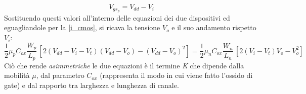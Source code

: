 \documentclass[12pt, a4paper]{report}
\begin{document}
\begin{equation}
    V_{gs_{p}} = V_{dd} - V_{i}
\end{equation}
Sostituendo questi valori all'interno delle equazioni dei due dispositivi ed eguagliandole per la \eqref{i_cmos}, si ricava la tensione $V_{o}$ e il suo andamento rispetto $V_i$:
\begin{equation*}
    \frac{1}{2}\mu_{p} C_{ox}\frac{W_p}{L_p}\,[2(V_{dd} - V_{i} - V_{t})(V_{dd} - V_{o}) - (V_{dd} - V_{o})^2] = \frac{1}{2}\mu_{n} C_{ox}\frac{W_n}{L_n}\,[2(V_{i} - V_{t})V_{o} - V_{o}^2]
\end{equation*}
Ciò che rende \textit{asimmetriche} le due equazioni è il termine \textit{K} che dipende dalla mobilità $\mu$, dal parametro $C_{ox}$ (rappresenta il modo in cui viene fatto l'ossido di gate) e dal rapporto tra larghezza e lunghezza di canale.
\end{document}
